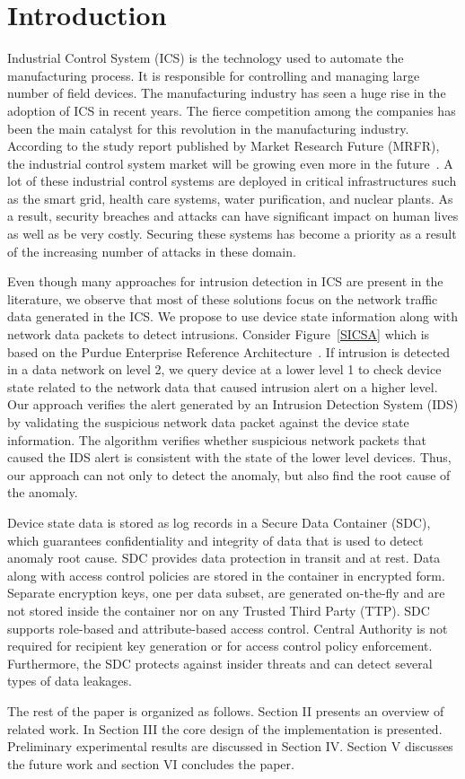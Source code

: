 \documentclass[conference]{IEEEtran}
\begin{document}
\section{Introduction}
Industrial Control System (ICS) is the technology used to automate the manufacturing process. It is responsible for controlling and managing large number of field devices. The manufacturing industry has seen a huge rise in the adoption of ICS in recent years. The fierce competition among the companies has been the main catalyst for this revolution in the manufacturing industry. According to the study report published by  Market Research Future (MRFR), the industrial control system market will be growing even more in the future~\cite{c1}. A lot of these industrial control systems are deployed in critical infrastructures such as the smart grid, health care systems, water purification, and nuclear plants. As a result, security breaches and attacks can have significant impact on human lives as well as be very costly. Securing these systems has become a priority as a result of the increasing number of attacks in these domain. 
\par Even though many approaches for intrusion detection in ICS are present in the literature, we observe that most of these solutions focus on the network traffic data generated in the ICS. We propose to use device state information along with network data packets to detect intrusions. Consider Figure~\ref{SICSA} which is based on the Purdue Enterprise Reference Architecture~\cite{c11}. If intrusion is detected in a data network on level 2, we query device at a lower level 1 to check  device state related to the network data that caused intrusion alert on a higher level. Our approach verifies the alert generated by an Intrusion Detection System (IDS) by validating the suspicious network data packet against the device state information. The algorithm verifies whether suspicious network packets that caused the IDS alert is consistent with the state of the lower level devices. Thus, our approach can not only to detect the anomaly, but also find the root cause of the anomaly. 

Device state data is stored as log records in a Secure Data Container (SDC), which guarantees confidentiality and integrity of data that is used to detect anomaly root cause. SDC provides data protection in transit and at rest. Data along with access control policies are stored in the container in encrypted form. Separate encryption keys, one per data subset, are generated on-the-fly and are not stored inside the container nor on any Trusted Third Party (TTP). SDC supports role-based and attribute-based access control. Central Authority is not required for recipient key generation or for access control policy enforcement. Furthermore, the SDC protects against insider threats and can detect several types of data leakages.      
\par The rest of the paper is organized as follows. Section II presents an overview of related work. In Section III the core design of the implementation is presented. Preliminary experimental results are discussed in Section IV. Section V discusses the future work and section VI concludes the paper.  
\end{document}
